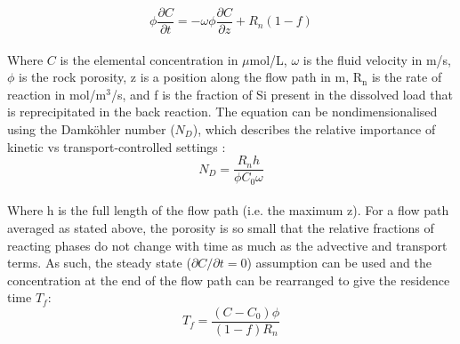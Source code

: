     \begin{equation}
    \phi \frac{\partial C}{\partial t} = -\omega \phi \frac{\partial C}{\partial z} + R_n(1-f)
    \label{eq:fontorbe}
    \end{equation}\\

Where \( C \) is the elemental concentration in $\mu$mol/L, $\omega$ is the fluid velocity in m/s, $\phi$ is the rock porosity, z is a position along the flow path in m, R$_\text{n}$ is the rate of reaction in mol/m$^3$/s, and f is the fraction of Si present in the dissolved load that is reprecipitated in the back reaction. The equation can be nondimensionalised using the Damköhler number (\(N_D\)), which describes the relative importance of kinetic vs transport-controlled settings \parencite{bethkeGEOCHEMICALBIOGEOCHEMICALREACTION}:\\

\begin{equation}
    N_D = \frac{R_n h}{\phi C_0 \omega}
\end{equation}\\

Where h is the full length of the flow path (i.e. the maximum z). For a flow path averaged as stated above, the porosity is so small that the relative fractions of reacting phases do not change with time as much as the advective and transport terms. As such, the steady state (\(\partial C/\partial t = 0\)) assumption can be used and the concentration at the end of the flow path can be rearranged to give the residence time \(T_f\):\\

\begin{equation}
    T_f = \frac{(C - C_0)\phi}{(1-f)R_n}
\end{equation}


